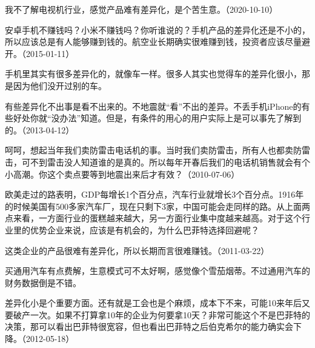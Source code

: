 我不了解电视机行业，感觉产品难有差异化，是个苦生意。（2020-10-10）


安卓手机不赚钱吗？小米不赚钱吗？你听谁说的？手机产品的差异化还是不小的，所以应该总是有人能够赚到钱的。航空业长期确实很难赚到钱，投资者应该尽量避开。（2015-01-11）


手机里其实有很多差异化的，就像车一样。很多人其实也觉得车的差异化很小，那是因为他们没开过别的车。

有些差异化不出事是看不出来的。不地震就“看”不出的差异。不丢手机iPhone的有些好处你就“没办法”知道。但是，有条件的用心的用户实际上是可以事先了解到的。（2013-04-12）


呵呵，想起当年我们卖防雷击电话机的事。当时我们卖防雷击，所有人也都卖防雷击，可不到雷击没人知道谁的是真的。所以每年开春后我们的电话机销售就会有个小高潮。你这个卖点要等到地震出来后才有效？（2010-07-06）


欧美走过的路表明，GDP每增长1个百分点，汽车行业就增长3个百分点。1916年的时候美国有500多家汽车厂，现在只剩下3家，中国可能会走同样的路。从上面两点来看，一方面行业的蛋糕越来越大，另一方面行业集中度越来越高。对于这个行业里的优势企业来说，应该是有机会的，为什么巴菲特选择回避呢？

这类企业的产品很难有差异化，所以长期而言很难赚钱。（2011-03-22）


买通用汽车有点费解，生意模式可不太好啊，感觉像个雪茄烟蒂。不过通用汽车的财务数据倒是不错。


差异化小是个重要方面。还有就是工会也是个麻烦，成本下不来，可能10来年后又要破产一次。如果不打算拿10年的企业为何要拿10天？非常可能这个不是巴菲特的决策，那可以看出巴菲特很宽容，但也看出巴菲特之后伯克希尔的能力确实会下降。（2012-05-18）


